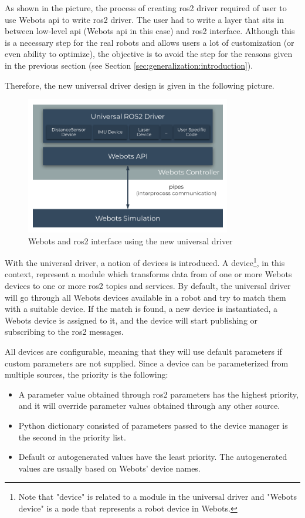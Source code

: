 As shown in the picture, the process of creating \ac{ros2} driver required of user to use Webots \ac{api} to write \ac{ros2} driver. 
The user had to write a layer that sits in between low-level \ac{api} (Webots \ac{api} in this case) and \ac{ros2} interface. 
Although this is a necessary step for the real robots and allows users a lot of customization (or even ability to optimize), the objective is to avoid the step for the reasons given in the previous section (see Section \ref{sec:generalization:introduction}).

Therefore, the new universal driver design is given in the following picture.
\begin{figure}[H]
    \centering
    \includegraphics[width=0.8\textwidth]{generalization/figures/universal_driver_within_webots.pdf}
    \caption{Webots and \ac{ros2} interface using the new universal driver}
    \label{fig:generalization:universal_driver_within_webots}
\end{figure}

With the universal driver, a notion of devices is introduced.
A device\footnote{Note that "device" is related to a module in the universal driver and "Webots device" is a node that represents a robot device in Webots.}, in this context, represent a module which transforms data from of one or more Webots devices to one or more \ac{ros2} topics and services.
By default, the universal driver will go through all Webots devices available in a robot and try to match them with a suitable device.
If the match is found, a new device is instantiated, a Webots device is assigned to it, and the device will start publishing or subscribing to the \ac{ros2} messages.

All devices are configurable, meaning that they will use default parameters if custom parameters are not supplied.
Since a device can be parameterized from multiple sources, the priority is the following:
\begin{itemize}
    \item A parameter value obtained through \ac{ros2} parameters has the highest priority, and it will override parameter values obtained through any other source.
    \item Python dictionary consisted of parameters passed to the device manager is the second in the priority list.
    \item Default or autogenerated values have the least priority. The autogenerated values are usually based on Webots' device names.
\end{itemize}

